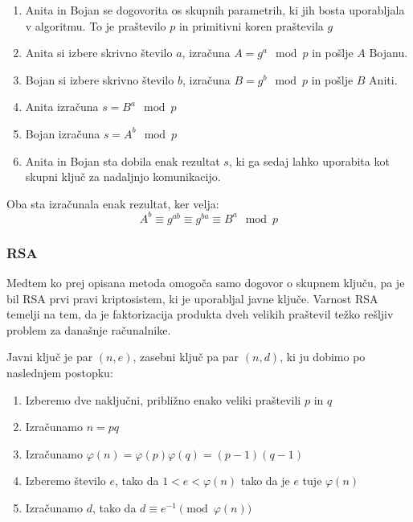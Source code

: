 \documentclass[12pt,a4paper,openany]{book}
\begin{document}
\begin{mdframed}[frametitle={Izmenjava ključa Diffe-Hellman}]
\begin{enumerate}
	\item Anita in Bojan se dogovorita os skupnih parametrih, ki jih bosta uporabljala v algoritmu. To je praštevilo $p$ in primitivni koren praštevila $g$
	\item Anita si izbere skrivno število $a$, izračuna $A=g^a \mod p$ in pošlje $A$ Bojanu.
	\item Bojan si izbere skrivno število $b$, izračuna $B=g^b \mod p$ in pošlje $B$ Aniti.
	\item Anita izračuna $s=B^a \mod p$
	\item Bojan izračuna $s=A^b \mod p$
	\item Anita in Bojan sta dobila enak rezultat $s$, ki ga sedaj lahko uporabita kot skupni ključ za nadaljnjo komunikacijo.
\end{enumerate}

\vspace{0.5cm}

Oba sta izračunala enak rezultat, ker velja:
$$
A^b \equiv g^{ab} \equiv g^{ba} \equiv B^a \mod p
$$

\end{mdframed}



\subsubsection{RSA}

Medtem ko prej opisana metoda omogoča samo dogovor o skupnem ključu, pa je bil RSA prvi pravi kriptosistem, ki je uporabljal javne ključe. Varnost RSA temelji na tem, da je faktorizacija produkta dveh velikih praštevil težko rešljiv problem za današnje računalnike.

Javni ključ je par $(n, e)$, zasebni ključ pa par $(n, d)$, ki ju dobimo po naslednjem postopku:

\begin{enumerate}
\item Izberemo dve naključni, približno enako veliki praštevili $p$ in $q$
\item Izračunamo $n=pq$
\item Izračunamo $\varphi(n)=\varphi(p)\varphi(q)=(p-1)(q-1)$
\item Izberemo število $e$, tako da $1<e<\varphi(n)$ tako da je $e$ tuje $\varphi(n)$
\item Izračunamo $d$, tako da $d \equiv e^{-1} \pmod{\varphi(n)}$
\end{enumerate}
\end{document}
